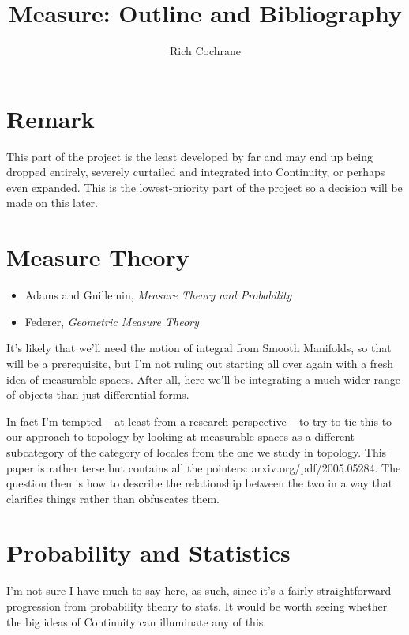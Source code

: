 \documentclass[article]{article}
\begin{document}
	
	\title{Measure: Outline and Bibliography}
	\author{Rich Cochrane}
	\maketitle
	
\section*{Remark}

This part of the project is the least developed by far and may end up being dropped entirely, severely curtailed and integrated into Continuity, or perhaps even expanded. This is the lowest-priority part of the project so a decision will be made on this later.


\section{Measure Theory}

\begin{itemize}
	\item{Adams and Guillemin, \textit{Measure Theory and Probability}}
	\item{Federer, \textit{Geometric Measure Theory}}
\end{itemize}

It's likely that we'll need the notion of integral from Smooth Manifolds, so that will be a prerequisite, but I'm not ruling out starting all over again with a fresh idea of measurable spaces. After all, here we'll be integrating a much wider range of objects than just differential forms.

In fact I'm tempted -- at least from a research perspective -- to try to tie this to our approach to topology by looking at measurable spaces as a different subcategory of the category of locales from the one we study in topology. This paper is rather terse but contains all the pointers: arxiv.org/pdf/2005.05284. The question then is how to describe the relationship between the two in a way that clarifies things rather than obfuscates them.

\section{Probability and Statistics}

I'm not sure I have much to say here, as such, since it's a fairly straightforward progression from probability theory to stats. It would be worth seeing whether the big ideas of Continuity can illuminate any of this. 
\end{document}
